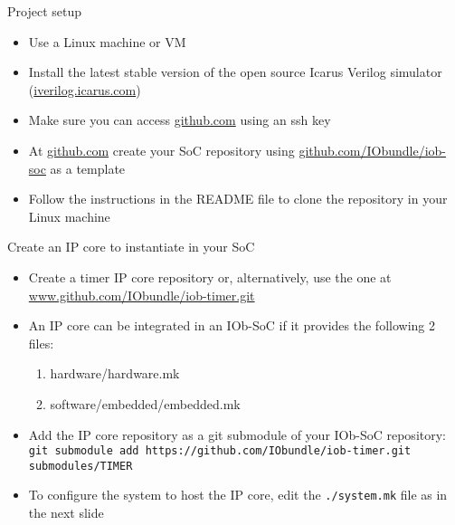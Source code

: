 \documentclass [xcolor=svgnames, t] {beamer}
\begin{document}
\begin{frame}{Project setup}
\begin{center}
  \begin{itemize}
    \item Use a Linux machine or VM
    \item Install the latest stable version of the open source Icarus Verilog simulator (\url{iverilog.icarus.com})
    \item Make sure you can access \url{github.com} using an ssh key
    \item At \url{github.com} create your SoC repository using \url{github.com/IObundle/iob-soc} as a template
    \item Follow the instructions in the README file to clone the repository in your Linux machine
  \end{itemize}
\end{center}
\end{frame}


\begin{frame}{Create an IP core to instantiate in your SoC}
  \begin{itemize}
  \item Create a timer IP core repository or, alternatively, use the one at \url{www.github.com/IObundle/iob-timer.git}
  \item An IP core can be integrated in an IOb-SoC if it provides the following 2 files: 
    \begin{enumerate}
    \item hardware/hardware.mk
    \item software/embedded/embedded.mk
    \end{enumerate}
  \item Add the IP core repository as a git submodule of your IOb-SoC repository:\\
    {\tt git submodule add https://github.com/IObundle/iob-timer.git submodules/TIMER}
  \item To configure the system to host the IP core, edit the {\tt ./system.mk} file as in the next slide
  \end{itemize}
\end{frame}

\lstset{basicstyle=\ttfamily,columns=fullflexible}
\end{document}
